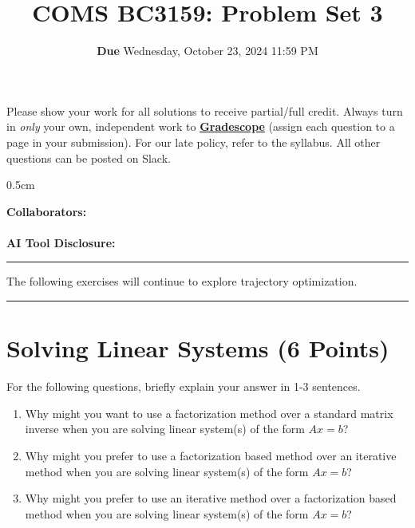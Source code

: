 \documentclass[]{article}
\title{\textbf{COMS BC3159:} Problem Set 3}
\author{\textbf{Due} Wednesday, October 23, 2024 11:59 PM\\
}
\date{}
\DeclareRobustCommand{\colorbox}[3][gray!10]{
  \begin{tcolorbox}[left=8pt, arc=0pt, outer arc=0pt, colframe=#1, colback=#1, coltext=black] #2 \end{tcolorbox}
}
\begin{document}
\maketitle

\colorbox {
Please show your work for all solutions to receive partial/full credit.  Always turn in \textit{only} your own, independent work to \href{https://www.gradescope.com/courses/820552}{\textbf{Gradescope}} (assign each question to a page in your submission).  For our late policy, refer to the syllabus.  All other questions can be posted on Slack.
}

\vspace{0.5cm}

\textbf{Collaborators:}
\\ \\
\textbf{AI Tool Disclosure:}

\vspace{0.5cm}
\hrule
\vspace{0.5cm}
The following exercises will continue to explore trajectory optimization.
\vspace{0.5cm}
\hrule

\section{Solving Linear Systems (6 Points)}
For the following questions, briefly explain your answer in 1-3 sentences.
\begin{tcolorbox}[left=14pt, arc=0pt, outer arc=0pt, colframe=blue!5, colback=blue!5]
\begin{enumerate}[label=(\alph*)]
    \item Why might you want to use a factorization method over a standard matrix inverse when you are solving linear system(s) of the form $Ax=b$?
    \item Why might you prefer to use a factorization based method over an iterative method when you are solving linear system(s) of the form $Ax=b$?
    \item Why might you prefer to use an iterative method over a factorization based method when you are solving linear system(s) of the form $Ax=b$?
\end{enumerate}
\end{tcolorbox}
\end{document}
